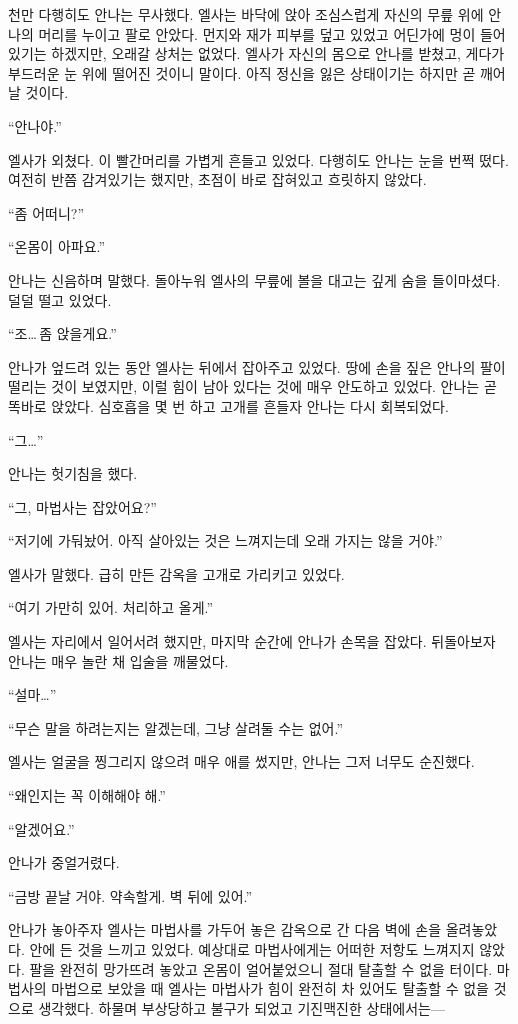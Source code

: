 천만 다행히도 안나는 무사했다. 엘사는 바닥에 앉아 조심스럽게 자신의 무릎 위에 안나의 머리를 누이고 팔로 안았다. 먼지와 재가 피부를 덮고 있었고 어딘가에 멍이 들어 있기는 하겠지만, 오래갈 상처는 없었다. 엘사가 자신의 몸으로 안나를 받쳤고, 게다가 부드러운 눈 위에 떨어진 것이니 말이다. 아직 정신을 잃은 상태이기는 하지만 곧 깨어날 것이다.

``안나야.''

엘사가 외쳤다. 이 빨간머리를 가볍게 흔들고 있었다. 다행히도 안나는 눈을 번쩍 떴다. 여전히 반쯤 감겨있기는 했지만, 초점이 바로 잡혀있고 흐릿하지 않았다.

``좀 어떠니?''

``온몸이 아파요.''

안나는 신음하며 말했다. 돌아누워 엘사의 무릎에 볼을 대고는 깊게 숨을 들이마셨다. 덜덜 떨고 있었다.

``조\ldots\,좀 앉을게요.''

안나가 엎드려 있는 동안 엘사는 뒤에서 잡아주고 있었다. 땅에 손을 짚은 안나의 팔이 떨리는 것이 보였지만, 이럴 힘이 남아 있다는 것에 매우 안도하고 있었다. 안나는 곧 똑바로 앉았다. 심호흡을 몇 번 하고 고개를 흔들자 안나는 다시 회복되었다.

``그\ldots''

안나는 헛기침을 했다.

``그, 마법사는 잡았어요?''

``저기에 가둬놨어. 아직 살아있는 것은 느껴지는데 오래 가지는 않을 거야.''

엘사가 말했다. 급히 만든 감옥을 고개로 가리키고 있었다.

``여기 가만히 있어. 처리하고 올게.''

엘사는 자리에서 일어서려 했지만, 마지막 순간에 안나가 손목을 잡았다. 뒤돌아보자 안나는 매우 놀란 채 입술을 깨물었다.

``설마\ldots''

``무슨 말을 하려는지는 알겠는데, 그냥 살려둘 수는 없어.''

엘사는 얼굴을 찡그리지 않으려 매우 애를 썼지만, 안나는 그저 너무도 순진했다.

``왜인지는 꼭 이해해야 해.''

``알겠어요.''

안나가 중얼거렸다.

``금방 끝날 거야. 약속할게. 벽 뒤에 있어.''

안나가 놓아주자 엘사는 마법사를 가두어 놓은 감옥으로 간 다음 벽에 손을 올려놓았다. 안에 든 것을 느끼고 있었다. 예상대로 마법사에게는 어떠한 저항도 느껴지지 않았다. 팔을 완전히 망가뜨려 놓았고 온몸이 얼어붙었으니 절대 탈출할 수 없을 터이다. 마법사의 마법으로 보았을 때 엘사는 마법사가 힘이 완전히 차 있어도 탈출할 수 없을 것으로 생각했다. 하물며 부상당하고 불구가 되었고 기진맥진한 상태에서는—

